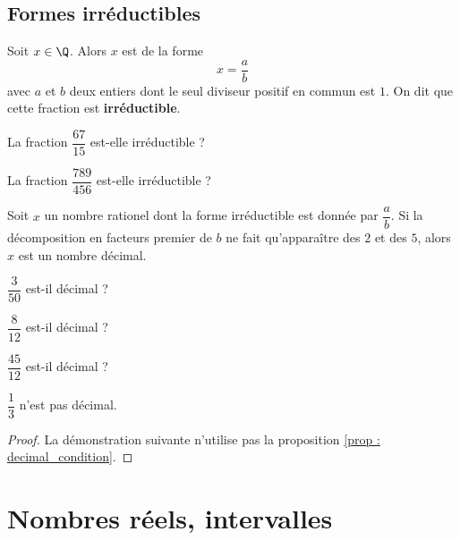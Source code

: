 \documentclass{article}
\begin{document}
\subsection{Formes irréductibles}
\begin{proposition}
Soit $x \in \Q$. Alors $x$ est de la forme
\begin{equation*}
x = \dfrac{a}{b}
\end{equation*}
avec $a$ et $b$ deux entiers dont le seul diviseur positif en commun est $1$. On dit que cette fraction est \textbf{irréductible}.
\end{proposition}
\begin{example}
\hfill
\begin{enumquestions}
\item La fraction $\dfrac{67}{15}$ est-elle irréductible ? \answersline
\item La fraction $\dfrac{789}{456}$ est-elle irréductible ? \answersline
\end{enumquestions}
\end{example}
\begin{proposition}
\label{prop : decimal_condition}
Soit $x$ un nombre rationel dont la forme irréductible est donnée par $\dfrac{a}{b}$. Si la décomposition en facteurs premier de $b$ ne fait qu'apparaître des $2$ et des $5$, alors $x$ est un nombre décimal.
\end{proposition}
\begin{example}
\hfill
\begin{enumquestions}
\item $\dfrac{3}{50}$ est-il décimal ? \answersline
\item $\dfrac{8}{12}$ est-il décimal ? \answersline
\item $\dfrac{45}{12}$ est-il décimal ? \answersline
\end{enumquestions}
\end{example}
\begin{proposition}
$\dfrac{1}{3}$ n'est pas décimal.
\end{proposition}
\begin{proof}
La démonstration suivante n'utilise pas la proposition \ref{prop : decimal_condition}.
\vspace*{0.5cm}

\emptybox{8cm}
\end{proof}

\newpage

\section{Nombres réels, intervalles}
\end{document}
